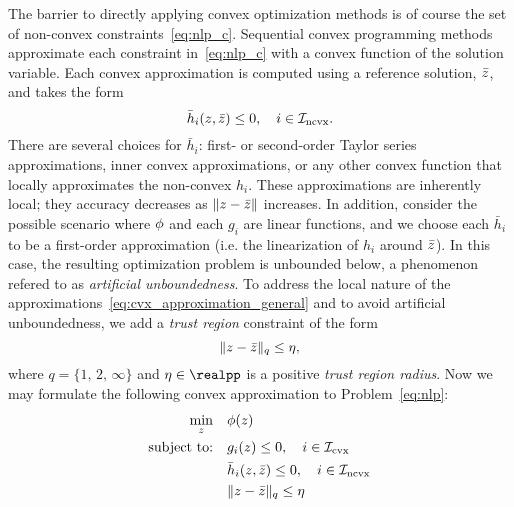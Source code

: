 \documentclass[letterpaper, 10 pt, conference]{ieeeconf}
\begin{document}
The barrier to directly applying convex optimization methods is of course the set of non-convex constraints~\eqref{eq:nlp_c}. Sequential convex programming methods approximate each constraint in~\eqref{eq:nlp_c} with a convex function of the solution variable. Each convex approximation is computed using a reference solution, $\bar{z}$, and takes the form
\begin{equation}
\bar{h}_i(z,\bar{z}) \leq 0, \quad i\in\mathcal{I}_{\text{ncvx}}.
\label{eq:cvx_approximation_general}
\end{equation}
There are several choices for $\bar{h}_i$: first- or second-order Taylor series approximations, inner convex approximations, or any other convex function that locally approximates the non-convex $h_i$. These approximations are inherently local; they accuracy decreases as $\|z-\bar{z}\|$ increases. In addition, consider the possible scenario where $\phi$ and each $g_i$ are linear functions, and we choose each $\bar{h}_i$ to be a first-order approximation (i.e. the linearization of $h_i$ around $\bar{z}$). In this case, the resulting optimization problem is unbounded below, a phenomenon refered to as \textit{artificial unboundedness}. To address the local nature of the approximations~\eqref{eq:cvx_approximation_general} and to avoid artificial unboundedness, we add a \textit{trust region} constraint of the form
\begin{equation}
\| z - \bar{z} \|_q \leq \eta,
\label{eq:trust_region}
\end{equation}
where $q=\{1,\,2,\,\infty\}$ and $\eta\in\realpp$ is a positive \textit{trust region radius}. Now we may formulate the following convex approximation to Problem~\eqref{eq:nlp}:
\begin{subequations}\label{eq:cvx_tr}
\begin{align}
\min_z &\quad \phi(z) \label{eq:cvx_tr_a} \\
\text{subject to:} &\quad g_i(z) \leq 0, \quad i\in\mathcal{I}_{\text{cvx}} \label{eq:cvx_tr_b} \\
&\quad \bar{h}_i(z,\bar{z}) \leq 0, \quad i\in\mathcal{I}_{\text{ncvx}} \label{eq:cvx_tr_c}\\
&\quad \| z - \bar{z} \|_q \leq \eta  \label{eq:cvx_tr_d}
\end{align}
\end{subequations}
\end{document}
